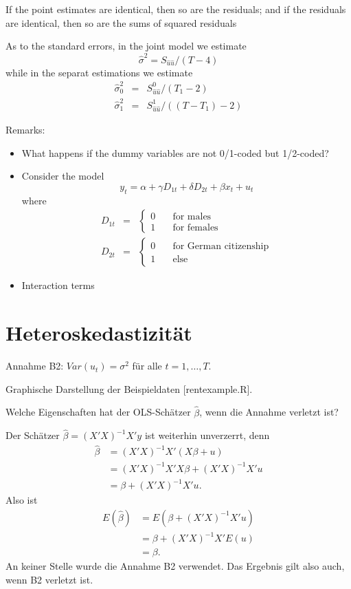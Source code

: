 \documentclass{article}
\begin{document}
If the point estimates are identical, then so are the residuals; and
if the residuals are identical, then so are the sums of squared residuals

As to the standard errors, in the joint model we estimate
\[ \hat{\sigma}^{2}=S_{\hat{u}\hat{u}}/\left( T-4\right) \]
while in the separat estimations we estimate
\begin{eqnarray*}
\hat{\sigma}_{0}^{2} &=&S_{\hat{u}\hat{u}}^{0}/\left( T_{1}-2\right) \\
\hat{\sigma}_{1}^{2} &=&S_{\hat{u}\hat{u}}^{1}/\left( \left( T-T_{1}\right)-2\right)
\end{eqnarray*}

Remarks:
\begin{itemize}
\item What happens if the dummy variables are not 0/1-coded but 1/2-coded?
\item Consider the model
\[ y_{t}=\alpha +\gamma D_{1t}+\delta D_{2t}+\beta x_{t}+u_{t} \]
where
\begin{eqnarray*}
D_{1t} &=&\left\{ 
\begin{array}{ll}
0 & \quad \text{for males} \\ 
1 & \quad \text{for females}
\end{array}
\right. \\
D_{2t} &=&\left\{ 
\begin{array}{ll}
0 & \quad \text{for German citizenship} \\ 
1 & \quad \text{else}
\end{array} \right.
\end{eqnarray*}
\item Interaction terms
\end{itemize}

\setcounter{section}{16}
\section{Heteroskedastizität}

Annahme B2: $Var(u_t)=\sigma^2$ für alle $t=1,\ldots,T$.

Graphische Darstellung der Beispieldaten [rentexample.R].

Welche Eigenschaften hat der OLS-Schätzer $\hat\beta$, wenn
die Annahme verletzt ist?

Der Schätzer $\hat\beta=(X'X)^{-1}X'y$ ist weiterhin unverzerrt, denn
\begin{align*}
\hat\beta &= (X'X)^{-1}X'(X\beta+u) \\
&=(X'X)^{-1}X'X\beta +(X'X)^{-1}X'u \\
&=\beta +(X'X)^{-1}X'u.
\end{align*}
Also ist
\begin{align*}
E(\hat\beta) &=E(\beta +(X'X)^{-1}X'u) \\
&=\beta +(X'X)^{-1}X'E(u) \\
&=\beta.
\end{align*}
An keiner Stelle wurde die Annahme B2 verwendet. Das Ergebnis
gilt also auch, wenn B2 verletzt ist.
\end{document}
